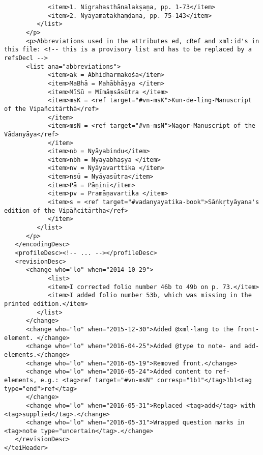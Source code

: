 \documentclass[article,12pt,a4paper]{memoir}%
\begin{document}
\begin{verbatim}
            <item>1. Nigrahasthānalakṣaṇa, pp. 1-73</item>
            <item>2. Nyāyamatakhaṃḍana, pp. 75-143</item>
         </list>
      </p>
      <p>Abbreviations used in the attributes ed, cRef and xml:id's in this file: <!-- this is a provisory list and has to be replaced by a refsDecl -->
      <list ana="abbreviations">
            <item>ak = Abhidharmakośa</item>
            <item>MaBhā = Mahābhāṣya </item>
            <item>MīSū = Mīmāṃsāsūtra </item>
            <item>msK = <ref target="#vn-msK">Kun-de-ling-Manuscript of the Vipañcitārthā</ref>
            </item>
            <item>msN = <ref target="#vn-msN">Nagor-Manuscript of the Vādanyāya</ref>
            </item>
            <item>nb = Nyāyabindu</item>
            <item>nbh = Nyāyabhāṣya </item>
            <item>nv = Nyāyavarttika </item>
            <item>nsū = Nyāyasūtra</item>
            <item>Pā = Pāṇini</item>
            <item>pv = Pramāṇavartika </item>
            <item>s = <ref target="#vadanyayatika-book">Sāṅkṛtyāyana's edition of the Vipāñcitārtha</ref>
            </item>
         </list>
      </p>
   </encodingDesc>
   <profileDesc><!-- ... --></profileDesc>
   <revisionDesc>
      <change who="lo" when="2014-10-29">
	        <list>
            <item>I corrected folio number 46b to 49b on p. 73.</item>
            <item>I added folio number 53b, which was missing in the printed edition.</item>
         </list>
      </change>
      <change who="lo" when="2015-12-30">Added @xml-lang to the front-element. </change>
      <change who="lo" when="2016-04-25">Added @type to note- and add-elements.</change>
      <change who="lo" when="2016-05-19">Removed front.</change>
      <change who="lo" when="2016-05-24">Added content to ref-elements, e.g.: <tag>ref target="#vn-msN" corresp="1b1"</tag>1b1<tag type="end">ref</tag>
      </change>
      <change who="lo" when="2016-05-31">Replaced <tag>add</tag> with <tag>supplied</tag>.</change>
      <change who="lo" when="2016-05-31">Wrapped question marks in <tag>note type="uncertain</tag>.</change>
   </revisionDesc>
</teiHeader>
	 \end{verbatim}
       
      \clearpage
      \begin{english}
      \printshorthands
      \printbibliography
      \end{english}
    
\end{document}
